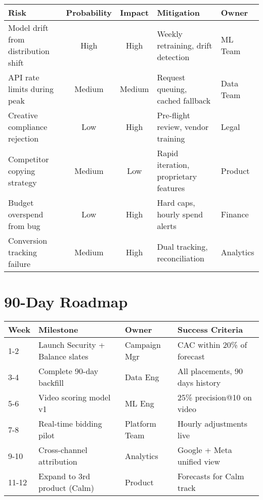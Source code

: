 \documentclass[11pt,a4paper]{report}
\begin{document}
\begin{table}[H]
\centering
\small
{}
\begin{tabularx}{\textwidth}{X|c|c|X|l}
\toprule
\textbf{Risk} & \textbf{Probability} & \textbf{Impact} & \textbf{Mitigation} & \textbf{Owner} \\
\midrule
Model drift from distribution shift & High & High & Weekly retraining, drift detection & ML Team \\
API rate limits during peak & Medium & Medium & Request queuing, cached fallback & Data Team \\
Creative compliance rejection & Low & High & Pre-flight review, vendor training & Legal \\
Competitor copying strategy & Medium & Low & Rapid iteration, proprietary features & Product \\
Budget overspend from bug & Low & High & Hard caps, hourly spend alerts & Finance \\
Conversion tracking failure & Medium & High & Dual tracking, reconciliation & Analytics \\
\bottomrule
\end{tabularx}
\end{table}

\chapter{90-Day Roadmap}

\begin{table}[H]
\centering
\begin{tabularx}{\textwidth}{l|X|l|X}
\toprule
\textbf{Week} & \textbf{Milestone} & \textbf{Owner} & \textbf{Success Criteria} \\
\midrule
1-2 & Launch Security + Balance slates & Campaign Mgr & CAC within 20\% of forecast \\
3-4 & Complete 90-day backfill & Data Eng & All placements, 90 days history \\
5-6 & Video scoring model v1 & ML Eng & 25\% precision@10 on video \\
7-8 & Real-time bidding pilot & Platform Team & Hourly adjustments live \\
9-10 & Cross-channel attribution & Analytics & Google + Meta unified view \\
11-12 & Expand to 3rd product (Calm) & Product & Forecasts for Calm track \\
\bottomrule
\end{tabularx}
\end{table}
\end{document}

